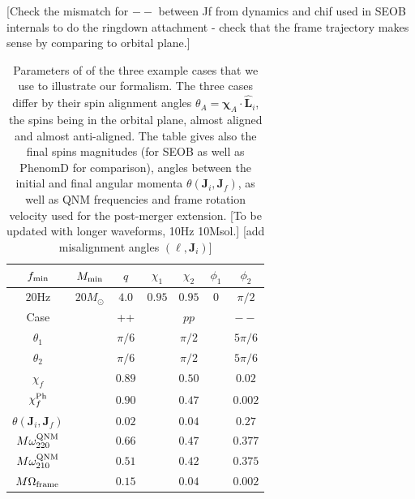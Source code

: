\documentclass[aps,showpacs,twocolumn,
prd,superscriptaddress,nofootinbib]{revtex4-1}
\newcommand{\Msol}{M_{\odot}}
\newcommand{\SM}[1]{{\color{Red} #1}}
\begin{document}
\SM{[Check the mismatch for $--$ between Jf from dynamics and chif used in SEOB internals to do the ringdown attachment - check that the frame trajectory makes sense by comparing to orbital plane.]}


\begin{table}[t]
\begin{ruledtabular}\caption{Parameters of of the three example cases that we use to illustrate our formalism. The three cases differ by their spin alignment angles $\theta_{A} = \bm{\chi}_{A} \cdot \hat{\bm{L}}_{i}$, the spins being in the orbital plane, almost aligned and almost anti-aligned. The table gives also the final spins magnitudes (for SEOB as well as PhenomD for comparison), angles between the initial and final angular momenta $\theta(\bm{J}_{i}, \bm{J}_{f})$, as well as QNM frequencies and frame rotation velocity used for the post-merger extension. \SM{[To be updated with longer waveforms, 10Hz 10Msol.]} \SM{[add misalignment angles $(\ell, \bm{J}_{i})$]}}\label{table:precparams}
\begin{tabular}{ccccccc}\label{table:precexamples}
	$f_{\rm min}$ & $ M_{\rm min} $ & $q$ & $\chi_{1}$ & $\chi_{2}$ & $ \phi_{1} $ & $ \phi_{2} $ \\
	\hline
	$20\mathrm{Hz}$ & $20\Msol$ & $ 4.0 $ & $ 0.95 $ & $ 0.95 $ & $0$ & $\pi/2$ \\
	\hline\hline
	Case && ++ && $pp$ && $--$ \\
	\hline
	$\theta_{1}$ && $\pi/6$ && $\pi/2$ && $5\pi/6$ \\
	$\theta_{2}$ && $\pi/6$ && $\pi/2$ && $5\pi/6$ \\
	\hline
	$\chi_{f}$ && $0.89$ && $0.50$ && $0.02$ \\
	$\chi_{f}^{\rm Ph}$ && $0.90$ && $0.47$ && $0.002$ \\
	$\theta(\bm{J}_{i}, \bm{J}_{f})$ && $0.02$ && $0.04$ && $0.27$ \\
	$M \omega_{220}^{\rm QNM}$ && $0.66$ && $0.47$ && $0.377$ \\
	$M \omega_{210}^{\rm QNM}$ && $0.51$ && $0.42$ && $0.375$ \\
	$M \Omega_{\rm frame}$ && $0.15$ && $0.04$ && $0.002$ \\
\end{tabular}
\end{ruledtabular}
\end{table}
\end{document}
